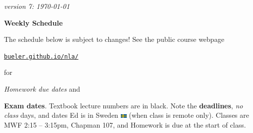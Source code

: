 \documentclass[12pt]{article}
\newcommand{\vacinline}[1]{{\color{OliveGreen} \textsl{#1}}}
\newcommand{\due}[1]{\strut {\color{BrickRed} \textsl{#1}}}
\newcommand{\ee}[1]{\strut {\color{Blue} \textbf{#1}}}
\newcommand{\dlinline}[1]{{\color{Purple} \textbf{#1}}}
\begin{document}
\hfill \small \emph{version 7: \today} \normalsize

\bigskip\bigskip
\centerline{\Large \textbf{Weekly Schedule}}

\bigskip
The schedule below is subject to changes!  See the public course webpage

\medskip

\centerline{\href{https://bueler.github.io/nla/index.html}{\texttt{bueler.github.io/nla/}}}

\noindent for \due{Homework due dates} and \ee{Exam dates}.  Textbook lecture numbers are in black.  Note the \dlinline{deadlines}, \vacinline{no class} days, and dates Ed is in Sweden \includegraphics[width=12px]{sweden.png} (when class is remote only).  Classes are MWF 2:15 -- 3:15pm, Chapman 107, and Homework is due at the start of class.

\bigskip
\end{document}
